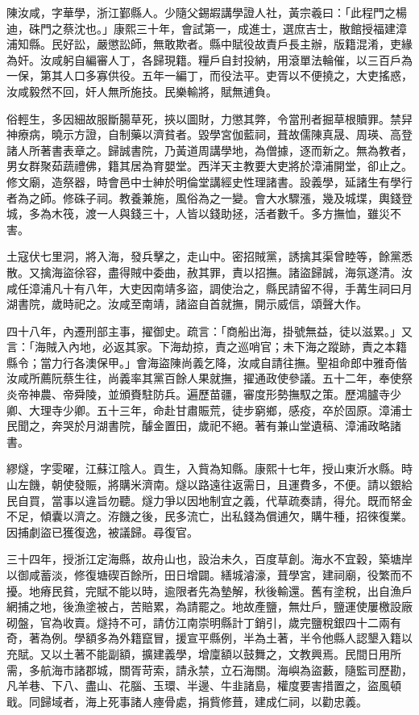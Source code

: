 \begin{pinyinscope}
陳汝咸，字華學，浙江鄞縣人。少隨父錫嘏講學證人社，黃宗羲曰：「此程門之楊迪，硃門之蔡沈也。」康熙三十年，會試第一，成進士，選庶吉士，散館授福建漳浦知縣。民好訟，嚴懲訟師，無敢欺者。縣中賦役故責戶長主辦，版籍混淆，吏緣為奸。汝咸躬自編審人丁，各歸現籍。糧戶自封投納，用滾單法輪催，以三百戶為一保，第其人口多寡供役。五年一編丁，而役法平。吏胥以不便撓之，大吏搖惑，汝咸毅然不回，奸人無所施技。民樂輸將，賦無逋負。

俗輕生，多因細故服斷腸草死，挾以圖財，力懲其弊，令當刑者掘草根贖罪。禁舁神療病，曉示方證，自制藥以濟貧者。毀學宮伽藍祠，葺故儒陳真晟、周瑛、高登諸人所著書表章之。歸誠書院，乃黃道周講學地，為僧據，逐而新之。無為教者，男女群聚茹蔬禮佛，籍其居為育嬰堂。西洋天主教要大吏將於漳浦開堂，卻止之。修文廟，造祭器，時會邑中士紳於明倫堂講經史性理諸書。設義學，延諸生有學行者為之師。修硃子祠。教養兼施，風俗為之一變。會大水驟漲，幾及城堞，輿錢登城，多為木筏，渡一人與錢三十，人皆以錢助拯，活者數千。多方撫恤，雖災不害。

土寇伏七里洞，將入海，發兵擊之，走山中。密招賊黨，誘擒其渠曾睦等，餘黨悉散。又擒海盜徐容，盡得賊中委曲，赦其罪，責以招撫。諸盜歸誠，海氛遂清。汝咸任漳浦凡十有八年，大吏因南靖多盜，調使治之，縣民請留不得，手冓生祠曰月湖書院，歲時祀之。汝咸至南靖，諸盜自首就撫，開示威信，頌聲大作。

四十八年，內遷刑部主事，擢御史。疏言：「商船出海，掛號無益，徒以滋累。」又言：「海賊入內地，必返其家。下海劫掠，責之巡哨官；未下海之蹤跡，責之本籍縣令；當力行各澳保甲。」會海盜陳尚義乞降，汝咸自請往撫。聖祖命郎中雅奇偕汝咸所薦阮蔡生往，尚義率其黨百餘人果就撫，擢通政使參議。五十二年，奉使祭炎帝神農、帝舜陵，並頒賚駐防兵。遍歷苗疆，審度形勢撫馭之策。歷鴻臚寺少卿、大理寺少卿。五十三年，命赴甘肅賑荒，徒步窮鄉，感疫，卒於固原。漳浦士民聞之，奔哭於月湖書院，醵金置田，歲祀不絕。著有兼山堂遺稿、漳浦政略諸書。

繆燧，字雯曜，江蘇江陰人。貢生，入貲為知縣。康熙十七年，授山東沂水縣。時山左饑，朝使發賑，將購米濟南。燧以路遠往返需日，且運費多，不便。請以銀給民自買，當事以違旨勿聽。燧力爭以因地制宜之義，代草疏奏請，得允。既而帑金不足，傾囊以濟之。洊饑之後，民多流亡，出私錢為償逋欠，購牛種，招徠復業。因捕劇盜已獲復逸，被議歸。尋復官。

三十四年，授浙江定海縣，故舟山也，設治未久，百度草創。海水不宜穀，築塘岸以御咸蓄淡，修復塘碶百餘所，田日增闢。繕城濬濠，葺學宮，建祠廟，役繁而不擾。地瘠民貧，完賦不能以時，逾限者先為墊解，秋後輸還。舊有塗稅，出自漁戶網捕之地，後漁塗被占，苦賠累，為請罷之。地故產鹽，無灶戶，鹽運使屢檄設廠砌盤，官為收賣。燧持不可，請仿江南崇明縣計丁銷引，歲完鹽稅銀四十二兩有奇，著為例。學額多為外籍竄冒，援宣平縣例，半為土著，半令他縣人認墾入籍以充賦。又以土著不能副額，擴建義學，增廩額以鼓舞之，文教興焉。民間日用所需，多航海市諸郡城，關胥苛索，請永禁，立石海關。海嶼為盜藪，隨監司歷勘，凡羊巷、下八、盡山、花腦、玉環、半邊、牛韭諸島，權度要害措置之，盜風頓戢。同歸域者，海上死事諸人瘞骨處，捐貲修葺，建成仁祠，以勸忠義。


\end{pinyinscope}
